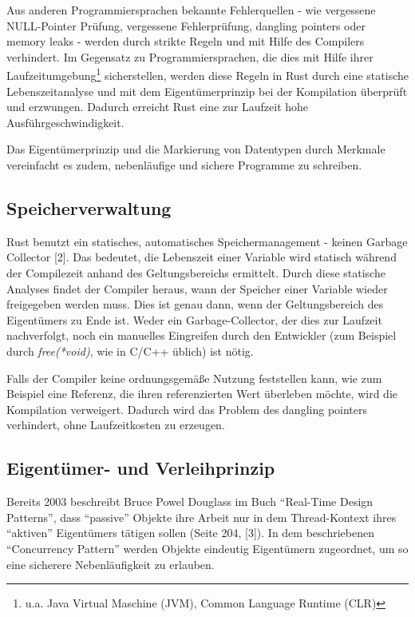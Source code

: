 \begin{multicols}{2}
\bildI

Aus anderen Programmiersprachen bekannte Fehlerquellen - wie vergessene NULL-Pointer Prüfung, vergessene Fehlerprüfung, dangling pointers oder memory leaks -  werden durch strikte Regeln und mit Hilfe des Compilers verhindert.
Im Gegensatz zu Programmiersprachen, die dies mit Hilfe ihrer Laufzeitumgebung\footnote{u.a. Java Virtual Maschine (JVM), Common Language Runtime (CLR)} sicherstellen, werden diese Regeln in Rust durch eine statische Lebenszeitanalyse und mit dem Eigentümerprinzip bei der Kompilation überprüft und erzwungen.
Dadurch erreicht Rust eine zur Laufzeit hohe Ausführgeschwindigkeit.

Das Eigentümerprinzip und die Markierung von Datentypen durch Merkmale vereinfacht es zudem, nebenläufige und sichere Programme zu schreiben.


\subsection*{Speicherverwaltung}

Rust benutzt ein statisches, automatisches Speichermanagement - keinen Garbage Collector [2].
Das bedeutet, die Lebenszeit einer Variable wird statisch während der Compilezeit anhand des Geltungsbereichs ermittelt.
Durch diese statische Analyses findet der Compiler heraus, wann der Speicher einer Variable wieder freigegeben werden muss.
Dies ist genau dann, wenn der Geltungsbereich des Eigentümers zu Ende ist.
Weder ein Garbage-Collector, der dies zur Laufzeit nachverfolgt, noch ein manuelles Eingreifen durch den Entwickler (zum Beispiel durch \textit{free(*void)}, wie in C/C++ üblich) ist nötig.

Falls der Compiler keine ordnungsgemäße Nutzung feststellen kann, wie zum Beispiel eine Referenz, die ihren referenzierten Wert überleben möchte, wird die Kompilation verweigert.
Dadurch wird das Problem des dangling pointers verhindert, ohne Laufzeitkosten zu erzeugen.

\subsection*{Eigentümer- und Verleihprinzip}

Bereits 2003 beschreibt Bruce Powel Douglass im Buch \enquote{Real-Time Design Patterns}, dass \enquote{passive} Objekte ihre Arbeit nur in dem Thread-Kontext ihres \enquote{aktiven} Eigentümers tätigen sollen (Seite 204, [3]).
In dem beschriebenen \enquote{Concurrency Pattern} werden Objekte eindeutig Eigentümern zugeordnet, um so eine sicherere Nebenläufigkeit zu erlauben.


\end{multicols}
